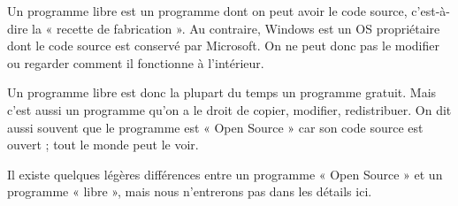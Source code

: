 \documentclass[11pt,oneside]{article}
\begin{document}
\begin{rem}
Un programme libre est un programme dont on peut avoir le code source, c'est-à-dire la « recette de fabrication ». Au contraire, Windows est un OS propriétaire dont le code source est conservé par Microsoft. On ne peut donc pas le modifier ou regarder comment il fonctionne à l'intérieur.

Un programme libre est donc la plupart du temps un programme gratuit. Mais c'est aussi un programme qu'on a le droit de copier, modifier, redistribuer. On dit aussi souvent que le programme est « Open Source » car son code source est ouvert ; tout le monde peut le voir.

Il existe quelques légères différences entre un programme « Open Source » et un programme « libre », mais nous n'entrerons pas dans les détails ici.
\end{rem}
\end{document}
